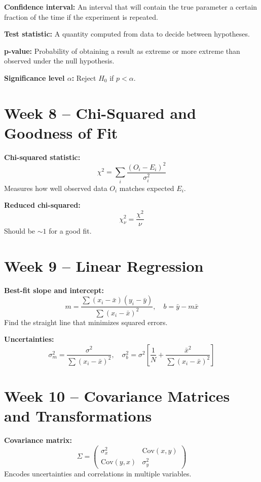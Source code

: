 \documentclass[11pt]{article}
\begin{document}
\textbf{Confidence interval:}
An interval that will contain the true parameter a certain fraction of the time if the experiment is repeated.

\textbf{Test statistic:}
A quantity computed from data to decide between hypotheses.

\textbf{p-value:}
Probability of obtaining a result as extreme or more extreme than observed under the null hypothesis.

\textbf{Significance level $\alpha$:}
Reject $H_0$ if $p < \alpha$.

\section*{Week 8 – Chi-Squared and Goodness of Fit}

\textbf{Chi-squared statistic:}
\[
    \chi^2 = \sum_{i} \frac{(O_i - E_i)^2}{\sigma_i^2}
\]
Measures how well observed data $O_i$ matches expected $E_i$.

\textbf{Reduced chi-squared:}
\[
    \chi^2_\nu = \frac{\chi^2}{\nu}
\]
Should be $\sim 1$ for a good fit.

\section*{Week 9 – Linear Regression}

\textbf{Best-fit slope and intercept:}
\[
    m = \frac{\sum (x_i - \bar{x})(y_i - \bar{y})}{\sum (x_i - \bar{x})^2}, \quad
    b = \bar{y} - m\bar{x}
\]
Find the straight line that minimizes squared errors.

\textbf{Uncertainties:}
\[
    \sigma_m^2 = \frac{\sigma^2}{\sum (x_i - \bar{x})^2}, \quad
    \sigma_b^2 = \sigma^2 \left[ \frac{1}{N} + \frac{\bar{x}^2}{\sum (x_i - \bar{x})^2} \right]
\]

\section*{Week 10 – Covariance Matrices and Transformations}

\textbf{Covariance matrix:}
\[
    \Sigma = \begin{pmatrix}
        \sigma_x^2        & \mathrm{Cov}(x,y) \\
        \mathrm{Cov}(y,x) & \sigma_y^2
    \end{pmatrix}
\]
Encodes uncertainties and correlations in multiple variables.
\end{document}
